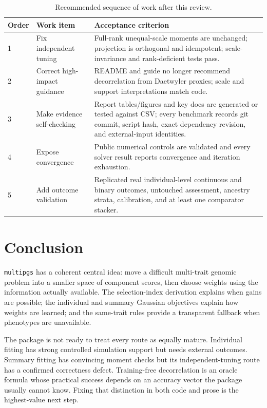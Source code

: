 \documentclass[10pt,a4paper]{article}
\newcommand{\pkg}[1]{\texttt{#1}}
\begin{document}
\begin{table}[H]
\centering
\caption{Recommended sequence of work after this review.}
\label{tab:roadmap}
\small
\begin{tabularx}{\linewidth}{@{}L{13mm}L{34mm}Y@{}}
\toprule
\textbf{Order} & \textbf{Work item} & \textbf{Acceptance criterion} \\
 & Fix independent tuning & Full-rank unequal-scale moments are unchanged;
projection is orthogonal and idempotent; scale-invariance and rank-deficient
tests pass. \\
2 & Correct high-impact guidance & README and guide no longer recommend
decorrelation from Daetwyler proxies; scale and support interpretations match
code. \\
3 & Make evidence self-checking & Report tables/figures and key docs are
generated or tested against CSV; every benchmark records git commit, script
hash, exact dependency revision, and external-input identities. \\
4 & Expose convergence & Public numerical controls are validated and every
solver result reports convergence and iteration exhaustion. \\
5 & Add outcome validation & Replicated real individual-level continuous and
binary outcomes, untouched assessment, ancestry strata, calibration, and at
least one comparator stacker. \\
\bottomrule
\end{tabularx}
\end{table}

\section{Conclusion}
\label{sec:conclusion}

\pkg{multipgs} has a coherent central idea: move a difficult multi-trait
genomic problem into a smaller space of component scores, then choose weights
using the information actually available. The selection-index derivation
explains when gains are possible; the individual and summary Gaussian
objectives explain how weights are learned; and the same-trait rules provide a
transparent fallback when phenotypes are unavailable.

The package is not ready to treat every route as equally mature. Individual
fitting has strong controlled simulation support but needs external outcomes.
Summary fitting has convincing moment checks but its independent-tuning route
has a confirmed correctness defect. Training-free decorrelation is an oracle
formula whose practical success depends on an accuracy vector the package
usually cannot know. Fixing that distinction in both code and prose is the
highest-value next step.
\end{document}
